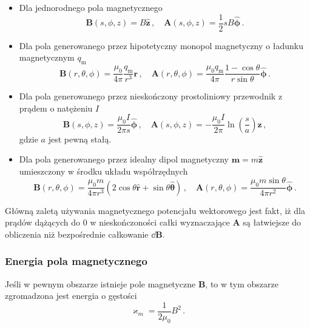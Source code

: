 \documentclass[../main.tex]{subfiles}
\begin{document}
\begin{itemize}
    \item Dla jednorodnego pola magnetycznego
\begin{equation*}
    \mathbf{B}(s,\phi,z)=B\mathbf{\hat{z}}\,,\quad \mathbf{A}(s,\phi,z)=\frac{1}{2}sB\boldsymbol{\hat{\phi}}\,.
\end{equation*}
    \item Dla pola generowanego przez hipotetyczny monopol magnetyczny o ładunku magnetycznym \(q_\text{m}\)
\begin{equation*}
    \mathbf{B}(r,\theta,\phi)=\frac{\mu_0}{4\pi}\frac{q_\text{m}}{r^3}\mathbf{r}\,,\quad     \mathbf{A}(r,\theta,\phi)=\frac{\mu_0q_\text{m}}{4\pi}\frac{1-\cos\theta}{r\sin\theta}\boldsymbol{\hat{\phi}}\,.
\end{equation*}
    \item Dla pola generowanego przez nieskończony prostoliniowy przewodnik z prądem o natężeniu \(I\)
    \begin{equation*}
        \mathbf{B}(s,\phi,z)=\frac{\mu_0I}{2\pi s}\boldsymbol{\hat{\phi}}\,,\quad \mathbf{A}(s,\phi,z)=-\frac{\mu_0I}{2\pi}\ln\left(\frac{s}{a}\right)\mathbf{\hat{z}}\,,
    \end{equation*}
    gdzie \(a\) jest pewną stałą.
    
    \item Dla pola generowanego przez idealny dipol magnetyczny \(\mathbf{m}=m\mathbf{\hat{z}}\) umieszczony w środku układu współrzędnych
    \begin{equation*}
        \mathbf{B}(r,\theta,\phi)=\frac{\mu_0m}{4\pi r^3}(2\cos\theta\mathbf{\hat{r}}+\sin\theta\boldsymbol{\hat{\theta}})\,,\quad \mathbf{A}(r,\theta,\phi)=\frac{\mu_0m\sin\theta}{4\pi r^2}\boldsymbol{\hat{\phi}}\,.
    \end{equation*}
\end{itemize}


Główną zaletą używania magnetycznego potencjału wektorowego jest fakt, iż dla prądów dążących do 0 w nieskończoności całki wyznaczające \(\mathbf{A}\) są łatwiejsze do obliczenia niż bezpośrednie całkowanie \(\dd{\mathbf{B}}\).
\subsubsection{Energia pola magnetycznego}
Jeśli w pewnym obszarze istnieje pole magnetyczne \(\mathbf{B}\), to w tym obszarze zgromadzona jest energia o gęstości
\begin{equation*}
    \varkappa_m=\frac{1}{2\mu_0}B^2\,.
\end{equation*}
\end{document}
